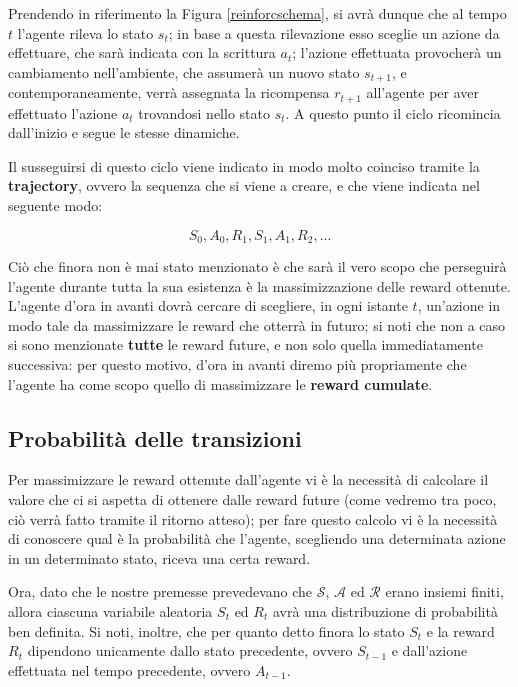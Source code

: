 \documentclass[a4paper,11pt,twoside]{report} %
\begin{document}
\vspace{10px}

Prendendo in riferimento la Figura \ref{reinforcschema}, si avrà dunque che al tempo $t$ l'agente rileva lo stato $s_{t}$; in base a questa rilevazione esso sceglie un azione da effettuare, che sarà indicata con la scrittura $a_{t}$; l'azione effettuata provocherà un cambiamento nell'ambiente, che assumerà un nuovo stato $s_{t+1}$, e contemporaneamente, verrà assegnata la ricompensa $r_{t+1}$ all'agente per aver effettuato l'azione $a_{t}$ trovandosi nello stato $s_{t}$. A questo punto il ciclo ricomincia dall'inizio e segue le stesse dinamiche.

Il susseguirsi di questo ciclo viene indicato in modo molto coinciso tramite la \textbf{trajectory}, ovvero la sequenza che si viene a creare, e che viene indicata nel seguente modo:

\begin{equation}
	S_{0},A_{0},R_{1},S_{1},A_{1},R_{2},...
\end{equation}

Ciò che finora non è mai stato menzionato è che sarà il vero scopo che perseguirà l'agente durante tutta la sua esistenza è la massimizzazione delle reward ottenute. L'agente d'ora in avanti dovrà cercare di scegliere, in ogni istante $t$, un'azione in modo tale da massimizzare le reward che otterrà in futuro; si noti che non a caso si sono menzionate \textbf{tutte} le reward future, e non solo quella immediatamente successiva: per questo motivo, d'ora in avanti diremo più propriamente che l'agente ha come scopo quello di massimizzare le \textbf{reward cumulate}.

\subsection{Probabilità delle transizioni}

Per massimizzare le reward ottenute dall'agente vi è la necessità di calcolare il valore che ci si aspetta di ottenere dalle reward future (come vedremo tra poco, ciò verrà fatto tramite il ritorno atteso); per fare questo calcolo vi è la necessità di conoscere qual è la probabilità che l'agente, scegliendo una determinata azione in un determinato stato, riceva una certa reward.

Ora, dato che le nostre premesse prevedevano che $\mathcal{S}$, $\mathcal{A}$ ed $\mathcal{R}$ erano insiemi finiti, allora ciascuna variabile aleatoria $S_{t}$ ed $R_{t}$ avrà una distribuzione di probabilità ben definita. Si noti, inoltre, che per quanto detto finora lo stato $S_{t}$ e la reward $R_{t}$ dipendono unicamente dallo stato precedente, ovvero $S_{t-1}$ e dall'azione effettuata nel tempo precedente, ovvero $A_{t-1}$.
\end{document}
